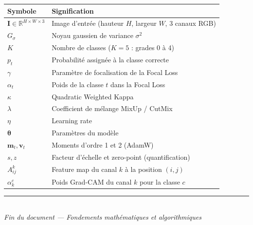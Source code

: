 \documentclass[11pt,a4paper]{article}
\newcommand{\R}{\mathbb{R}}
\begin{document}
\begin{center}
\renewcommand{\arraystretch}{1.3}
\begin{tabularx}{\textwidth}{lX}
\toprule
\textbf{Symbole} & \textbf{Signification} \\
\midrule
$\mathbf{I} \in \R^{H \times W \times 3}$ & Image d'entrée (hauteur $H$, largeur $W$, 3 canaux RGB) \\
$G_\sigma$ & Noyau gaussien de variance $\sigma^2$ \\
$K$ & Nombre de classes ($K = 5$ : grades 0 à 4) \\
$p_t$ & Probabilité assignée à la classe correcte \\
$\gamma$ & Paramètre de focalisation de la Focal Loss \\
$\alpha_t$ & Poids de la classe $t$ dans la Focal Loss \\
$\kappa$ & Quadratic Weighted Kappa \\
$\lambda$ & Coefficient de mélange MixUp / CutMix \\
$\eta$ & Learning rate \\
$\bm{\theta}$ & Paramètres du modèle \\
$\mathbf{m}_t, \mathbf{v}_t$ & Moments d'ordre 1 et 2 (AdamW) \\
$s, z$ & Facteur d'échelle et zero-point (quantification) \\
$A^k_{ij}$ & Feature map du canal $k$ à la position $(i,j)$ \\
$\alpha_k^c$ & Poids Grad-CAM du canal $k$ pour la classe $c$ \\
\bottomrule
\end{tabularx}
\end{center}

\vfill
\begin{center}
\textcolor{accent}{\rule{0.5\textwidth}{0.5pt}}\\[0.5em]
\textit{Fin du document --- Fondements mathématiques et algorithmiques}
\end{center}
\end{document}
